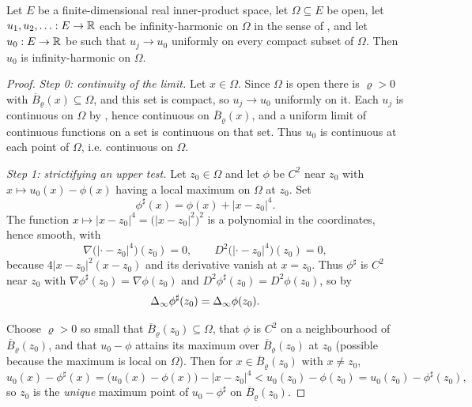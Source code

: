 \begin{lemma}
Let $E$ be a finite-dimensional real inner-product space, let $\Omega\subseteq E$
be open, let $u_1,u_2,\ldots:E\to\mathbb{R}$ each be infinity-harmonic on $\Omega$ in the
sense of , and let $u_0:E\to\mathbb{R}$ be such that
$u_j\to u_0$ uniformly on every compact subset of $\Omega$. Then $u_0$ is
infinity-harmonic on $\Omega$.
\end{lemma}
\begin{proof}
\emph{Step 0: continuity of the limit.}
Let $x\in\Omega$. Since $\Omega$ is open there is $\varrho>0$ with
$\overline B_\varrho(x)\subseteq\Omega$, and this set is compact, so
$u_j\to u_0$ uniformly on it. Each $u_j$ is continuous on $\Omega$ by
, hence continuous on $\overline B_\varrho(x)$, and a
uniform limit of continuous functions on a set is continuous on that set. Thus
$u_0$ is continuous at each point of $\Omega$, i.e. continuous on $\Omega$.

\emph{Step 1: strictifying an upper test.}
Let $z_0\in\Omega$ and let $\phi$ be $C^2$ near $z_0$ with
$x\mapsto u_0(x)-\phi(x)$ having a local maximum on $\Omega$ at $z_0$. Set
\[
  \phi^\sharp(x)=\phi(x)+|x-z_0|^4 .
\]
The function $x\mapsto|x-z_0|^4=\bigl(|x-z_0|^2\bigr)^2$ is a polynomial in the
coordinates, hence smooth, with
\begin{equation}\label{eq:stab-fourth}
  \nabla\bigl(|\cdot-z_0|^4\bigr)(z_0)=0,\qquad
  D^2\bigl(|\cdot-z_0|^4\bigr)(z_0)=0 ,
\end{equation}
because $4|x-z_0|^2(x-z_0)$ and its derivative vanish at $x=z_0$. Thus
$\phi^\sharp$ is $C^2$ near $z_0$ with
$\nabla\phi^\sharp(z_0)=\nabla\phi(z_0)$ and
$D^2\phi^\sharp(z_0)=D^2\phi(z_0)$, so by 
\begin{equation}\label{eq:stab-same-jet}
  \Delta_{\infty}\phi^\sharp(z_0)=\Delta_{\infty}\phi(z_0).
\end{equation}

Choose $\varrho>0$ so small that $\overline B_\varrho(z_0)\subseteq\Omega$, that
$\phi$ is $C^2$ on a neighbourhood of $\overline B_\varrho(z_0)$, and that
$u_0-\phi$ attains its maximum over $\overline B_\varrho(z_0)$ at $z_0$ (possible
because the maximum is local on $\Omega$). Then for
$x\in\overline B_\varrho(z_0)$ with $x\ne z_0$,
\[
  u_0(x)-\phi^\sharp(x)=\bigl(u_0(x)-\phi(x)\bigr)-|x-z_0|^4
    <u_0(z_0)-\phi(z_0)=u_0(z_0)-\phi^\sharp(z_0),
\]
so $z_0$ is the \emph{unique} maximum point of $u_0-\phi^\sharp$ on
$\overline B_\varrho(z_0)$.


\end{proof}
